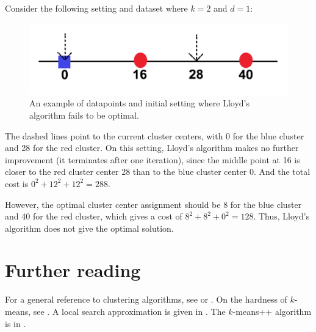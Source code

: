 \begin{example} Consider the following setting and dataset
where $k=2$ and $d=1$:
\begin{figure}
    \centering
    \captionsetup{width=0.8\textwidth}
    \includegraphics[scale=0.4]{chapter_1/files/kmeans.png}
    \caption{An example of datapoints and initial setting where
    Lloyd's algorithm fails to be optimal.}
    \label{fig:kmeans}
\end{figure}
The dashed lines point to the current cluster centers, with 0
for the blue cluster and 28 for the red cluster. On this
setting, Lloyd's algorithm makes no further improvement (it
terminates after one iteration), since the middle point at 16
is closer to the red cluster center 28 than to the blue cluster
center 0. And the total cost is $0^2+12^2+12^2=288$.

However, the optimal cluster center assignment should be 8 for
the blue cluster and 40 for the red cluster, which gives a cost
of $8^2+8^2+0^2=128$. Thus, Lloyd's algorithm does not give the
optimal solution.
\end{example}

\section{Further reading}
For a general reference to clustering algorithms, see \cite{har75}
or \cite{gon85}. On the hardness of $k$-means, see \cite{das2008}.
A local search approximation is given in \cite{kan2004}. The 
$k$-means++ algorithm is in \cite{art2007}.
